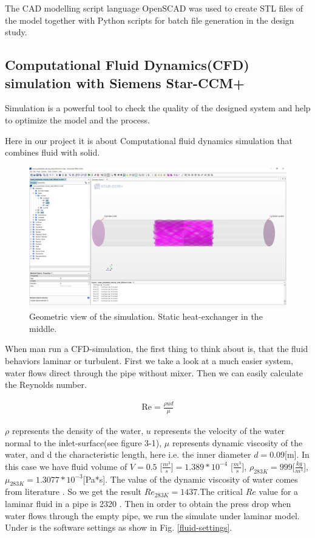 \documentclass[journal,article,processes,submit,moreauthors,pdftex]{Definitions/mdpi}
\begin{document}
The CAD modelling script language OpenSCAD \cite{openscad} was used to create STL files of the model together with Python \cite{python} scripts for batch file generation in the design study.

\subsection{Computational Fluid Dynamics(CFD) simulation with Siemens Star-CCM+}
Simulation is a powerful tool to check the quality of the designed system and help to optimize the model and the process. 

Here in our project it is about Computational fluid dynamics simulation that combines fluid with solid. 

\begin{figure}
\begin{center}
\centerline{\includegraphics[width=\textwidth]{./docu_pictures/sketch1.png}}
\end{center}
\caption{Geometric view of the simulation. Static heat-exchanger in the middle.}
\label{simulation-sketch}
\end{figure}

When man run a CFD-simulation, the first thing to think about is, that the fluid behaviors laminar or turbulent. First we take a look at a much easier system, water flows direct through the pipe without mixer. Then we can easily calculate the Reynolds number. 

\begin{align*}
    \text{Re} = \frac{\rho ud}{\mu}
\end{align*}

$\rho$ represents the density of the water, $u$ represents the velocity of the water normal to the inlet-surface(see figure 3-1), $\mu$ represents dynamic viscosity of the water, and d the characteristic length, here i.e. the inner diameter $d=0.09$[m]. In this case we have fluid volume of $V = 0.5$ [$\frac{m^3}{s}]=1.389*10^{-4}$ [$\frac{m^3}{s}]$, $\rho_{283K}=999$[$\frac{kg}{m^3}$], $\mu_{283K}=1.3077*10^{-3}$[Pa*s]. The value of the dynamic viscosity of water comes from literature \cite{link-3}. So we get the result $Re_{283K}=1437$.The critical $Re$ value for a laminar fluid in a pipe is 2320 \cite{script}. Then in order to obtain the press drop when water flows through the empty pipe, we run the simulate under laminar model. Under is the software settings as show in Fig. \ref{fluid-settings}. 
\end{document}
